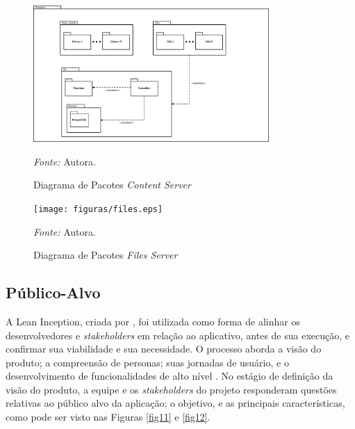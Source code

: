 \begin{figure}[h!]
	\centering
	\caption{Diagrama de Pacotes \textit{Content Server}}
	\begin{adjustbox}{center}
		\includegraphics[width=0.8\textwidth]{figuras/content.eps}
	\end{adjustbox}
	\begin{tablenotes}[flushleft]
		\centering
		\item \textit{Fonte:} Autora.
	\end{tablenotes}
	\label{fig09}
\end{figure}

\begin{figure}[h!]
	\centering
	\caption{Diagrama de Pacotes \textit{Files Server}}
	\begin{adjustbox}{center}
		\texttt{[image: figuras/files.eps]}
	\end{adjustbox}
	\begin{tablenotes}[flushleft]
		\centering
		\item \textit{Fonte:} Autora.
	\end{tablenotes}
	\label{fig10}
\end{figure}

\subsection{Público-Alvo}
\label{Publico-Alvo}
A Lean Inception, criada por , foi utilizada como forma de alinhar os desenvolvedores e \textit{stakeholders} em relação ao aplicativo, antes de sua execução, e confirmar sua viabilidade e sua necessidade. O processo aborda a visão do produto; a compreensão de personas; suas jornadas de usuário, e 
o desenvolvimento de funcionalidades de alto nível \cite{lean}. No estágio de definição da visão do produto, a equipe e os \textit{stakeholders} do projeto responderam questões relativas ao público alvo da aplicação; o objetivo, e as principais características, como pode ser visto nas 
Figuras \ref{fig11} e \ref{fig12}. 

